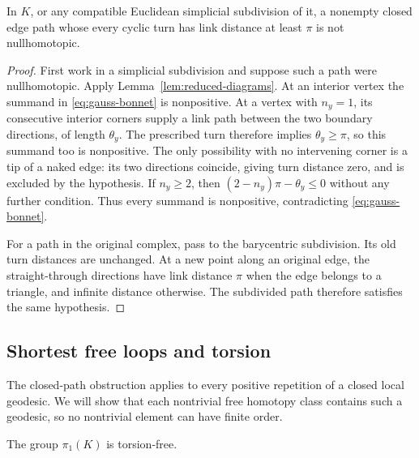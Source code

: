 \pagebreak[0]
\begin{samepage}
\begin{proposition}
\label{prop:closed-paths}
In $K$, or any compatible Euclidean simplicial subdivision of it, a
nonempty closed edge path whose every cyclic turn has link distance at
least $\pi$ is not nullhomotopic.
\end{proposition}
\end{samepage}

\begin{proof}
First work in a simplicial subdivision and suppose such a path were
nullhomotopic. Apply Lemma~\ref{lem:reduced-diagrams}. At an interior
vertex the summand in \eqref{eq:gauss-bonnet} is nonpositive. At a vertex
with $n_y=1$, its consecutive interior corners supply a link path between
the two boundary directions, of length $\theta_y$. The prescribed turn
therefore implies $\theta_y\ge\pi$, so this summand too is nonpositive.
The only possibility with no intervening corner is a tip of a naked
edge: its two directions coincide, giving turn distance zero, and is
excluded by the hypothesis. If $n_y\ge2$, then
$(2-n_y)\pi-\theta_y\le0$ without any further condition. Thus every
summand is nonpositive, contradicting \eqref{eq:gauss-bonnet}.

For a path in the original complex, pass to the barycentric subdivision.
Its old turn distances are unchanged. At a new point along an original
edge, the straight-through directions have link distance $\pi$ when
the edge belongs to a triangle, and infinite distance otherwise.
The subdivided path therefore satisfies the same hypothesis.
\end{proof}

\subsection{Shortest free loops and torsion}

The closed-path obstruction applies to every positive repetition of a
closed local geodesic. We will show that each nontrivial free homotopy
class contains such a geodesic, so no nontrivial element can have finite
order.

\begin{proposition}
\label{prop:no-torsion}
The group $\pi_1(K)$ is torsion-free.
\end{proposition}

